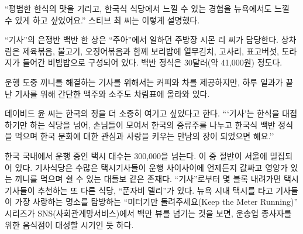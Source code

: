 \documentclass{translation}
\begin{document}
``평범한 한식의 맛을 기리고, 한국식 식당에서 느낄 수 있는 경험을 뉴욕에서도 느낄 수 있게 하고 싶었어요.''
스티브 최 씨는 이렇게 설명했다.
%

``기사''의 은쟁반 백반 한 상은 ``주아''에서 일하던 주방장 시몬 리 씨가 담당한다.
상차림은 제육볶음, 불고기, 오징어볶음과 함께 보리밥에 열무김치, 고사리, 표고버섯, 도라지가 들어간 비빔밥으로 구성되어 있다.
백반 정식은 30달러(약 41,000원) 정도다.
%

운행 도중 끼니를 해결하는 기사를 위해서는 커피와 차를 제공하지만, 하루 일과가 끝난 기사를 위해 간단한 맥주와 소주도 차림표에 올라와 있다.
%

데이비드 윤 씨는 한국의 정을 더 소중히 여기고 싶었다고 한다.
```기사'는 한식을 대접하기만 하는 식당을 넘어, 손님들이 모여서 한국의 증류주를 나누고 한국식 백반 정식을 먹으며 한국 문화에 대한 관심과 사랑을 키우는 만남의 장이 되었으면 해요.''
%

한국 국내에서 운행 중인 택시 대수는 300,000을 넘는다. 이 중 절반이 서울에 밀집되어 있다.
기사식당은 수많은 택시기사들이 운행 사이사이에 언제든지 값싸고 영양가 있는 끼니를 먹으며 쉴 수 있는 대들보 같은 존재다.
``기사''로부터 몇 블록 내려가면 택시기사들이 추천하는 또 다른 식당, ``푼자비 델리''가 있다.
뉴욕 시내 택시를 타고 기사들이 가장 사랑하는 명소를 탐방하는 ``미터기만 돌려주세요(Keep the Meter Running)'' 시리즈가 SNS(사회관계망서비스)에서 백만 뷰를 넘기는 것을 보면, 운송업 종사자를 위한 음식점이 대성할 시기인 듯 하다.
%
\end{document}
